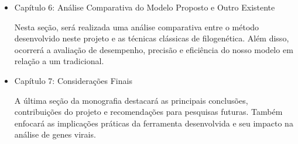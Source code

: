\begin{itemize}
      \item Capítulo 6: Análise Comparativa do Modelo Proposto e Outro Existente

            Nesta seção, será realizada uma análise comparativa entre o método desenvolvido neste projeto e as técnicas clássicas de filogenética. Além disso, ocorrerá a avaliação de desempenho, precisão e eficiência do nosso modelo em relação a um tradicional.

      \item Capítulo 7: Considerações Finais

            A última seção da monografia destacará as principais conclusões, contribuições do projeto e recomendações para pesquisas futuras. Também enfocará as implicações práticas da ferramenta desenvolvida e seu impacto na análise de genes virais.
\end{itemize}

